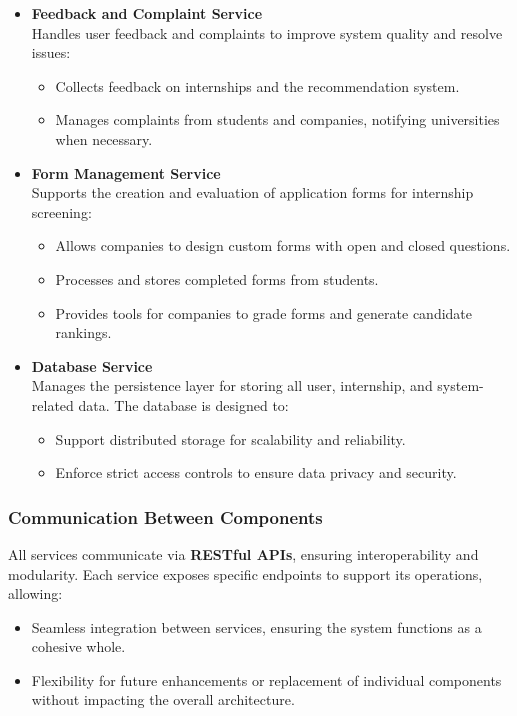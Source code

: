\documentclass[11pt,twoside]{article}
\begin{document}
\begin{itemize}
    \item \textbf{Feedback and Complaint Service} \\
    Handles user feedback and complaints to improve system quality and resolve issues:
    \begin{itemize}
        \item Collects feedback on internships and the recommendation system.
        \item Manages complaints from students and companies, notifying universities when necessary.
    \end{itemize}

    \item \textbf{Form Management Service} \\
    Supports the creation and evaluation of application forms for internship screening:
    \begin{itemize}
        \item Allows companies to design custom forms with open and closed questions.
        \item Processes and stores completed forms from students.
        \item Provides tools for companies to grade forms and generate candidate rankings.
    \end{itemize}

    \item \textbf{Database Service} \\
    Manages the persistence layer for storing all user, internship, and system-related data. The database is designed to:
    \begin{itemize}
        \item Support distributed storage for scalability and reliability.
        \item Enforce strict access controls to ensure data privacy and security.
    \end{itemize}
\end{itemize}

\subsubsection{Communication Between Components}
All services communicate via \textbf{RESTful APIs}, ensuring interoperability and modularity. Each service exposes specific endpoints to support its operations, allowing:
\begin{itemize}
    \item Seamless integration between services, ensuring the system functions as a cohesive whole.
    \item Flexibility for future enhancements or replacement of individual components without impacting the overall architecture.
\end{itemize}
\end{document}
